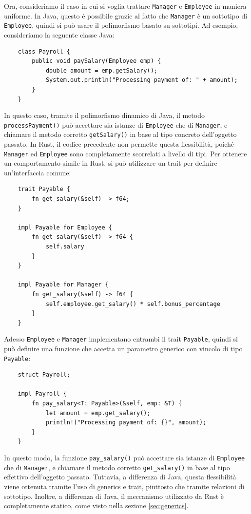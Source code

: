 Ora, consideriamo il caso in cui si voglia trattare \texttt{Manager} e \texttt{Employee} in maniera uniforme. In Java, questo è possibile grazie al fatto che \texttt{Manager} è un sottotipo di \texttt{Employee}, quindi si può usare il polimorfismo basato su sottotipi. Ad esempio, consideriamo la seguente classe Java:
\begin{verbatim}
    class Payroll {
        public void paySalary(Employee emp) {
            double amount = emp.getSalary();
            System.out.println("Processing payment of: " + amount);
        }
    }
\end{verbatim}
In questo caso, tramite il polimorfismo dinamico di Java, il metodo \texttt{processPayment()} può accettare sia istanze di \texttt{Employee} che di \texttt{Manager}, e chiamare il metodo corretto \texttt{getSalary()} in base al tipo concreto dell'oggetto passato. In Rust, il codice precedente non permette questa flessibilità, poiché \texttt{Manager} ed \texttt{Employee} sono completamente scorrelati a livello di tipi. Per ottenere un comportamento simile in Rust, si può utilizzare un trait per definire un'interfaccia comune:
\begin{verbatim}
    trait Payable {
        fn get_salary(&self) -> f64;
    }

    impl Payable for Employee {
        fn get_salary(&self) -> f64 {
            self.salary
        }
    }

    impl Payable for Manager {
        fn get_salary(&self) -> f64 {
            self.employee.get_salary() * self.bonus_percentage
        }
    }
\end{verbatim}
Adesso \texttt{Employee} e \texttt{Manager} implementano entrambi il trait \texttt{Payable}, quindi si può definire una funzione che accetta un parametro generico con vincolo di tipo \texttt{Payable}:
\begin{verbatim}
    struct Payroll;

    impl Payroll {
        fn pay_salary<T: Payable>(&self, emp: &T) {
            let amount = emp.get_salary();
            println!("Processing payment of: {}", amount);
        }
    }
\end{verbatim}
In questo modo, la funzione \texttt{pay\_salary()} può accettare sia istanze di \texttt{Employee} che di \texttt{Manager}, e chiamare il metodo corretto \texttt{get\_salary()} in base al tipo effettivo dell'oggetto passato. Tuttavia, a differenza di Java, questa flessibilità viene ottenuta tramite l'uso di generics e trait, piuttosto che tramite relazioni di sottotipo. Inoltre, a differenza di Java, il meccanismo utilizzato da Rust è completamente statico, come visto nella sezione \ref{sec:generics}. 


